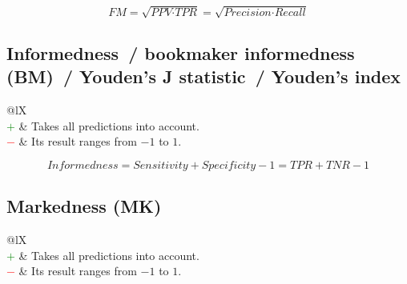 \documentclass{article}
\begin{document}
\begin{equation}
    \textit{FM} = \sqrt{\textit{PPV} \cdot \textit{TPR}} = \sqrt{\textit{Precision} \cdot \textit{Recall}}
%
    \label{equation:FM}
\end{equation}


\subsection[Informedness~/ bookmaker informedness (BM)~/ Youden's J statistic~/ Youden's index]{Informedness~/ bookmaker informedness (BM)~/ Youden's J statistic~/ Youden's index \cite{peirce1884numerical, youden1950index}}

\begin{table}[H]\centering
    \begin{tabularx}{\textwidth}{@{}lX}
         \\
        \textcolor{Green}{$+$} & Takes all predictions into account. \\
        \textcolor{Red}{$-$}   & Its result ranges from $-1$ to $1$.
    \end{tabularx}
\end{table}

\begin{equation}
    \textit{Informedness} = \textit{Sensitivity} + \textit{Specificity} - 1 = \textit{TPR} + \textit{TNR} - 1
%
    \label{equation:informedness}
\end{equation}


\subsection[Markedness (MK)]{Markedness (MK) \cite{powers2020evaluation}}

\begin{table}[H]\centering
    \begin{tabularx}{\textwidth}{@{}lX}
         \\
        \textcolor{Green}{$+$} & Takes all predictions into account. \\
        \textcolor{Red}{$-$}   & Its result ranges from $-1$ to $1$.
    \end{tabularx}
\end{table}
\end{document}
